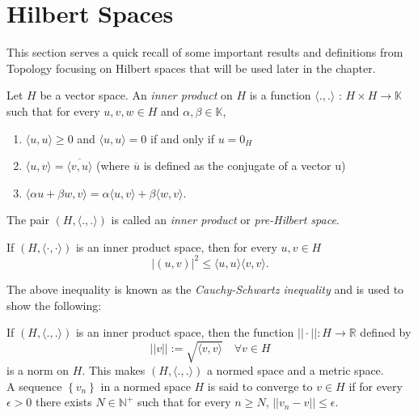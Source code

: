 \section{Hilbert Spaces}
This section serves a quick recall of some important results and definitions from Topology focusing on Hilbert spaces that will be used later in the chapter. 
\begin{definition}
Let $H$ be a vector space. An \textit{inner product} on $H$ is a function $\langle.,. \rangle$ : $H \times H \rightarrow \mathbb{K}$ such that for every $u, v, w \in H$ and $\alpha, \beta \in \mathbb{K}$,
\begin{enumerate}
\item $\langle u,u \rangle \geq 0$ and $\langle u,u \rangle = 0$ if and only if $u = 0_{H}$
\item $\langle u,v \rangle = \overline{\langle v,u \rangle}$ (where $\overline{u}$ is defined as the conjugate of a vector u)
\item $\langle \alpha u + \beta w,v \rangle = \alpha \langle u,v \rangle + \beta \langle w,v \rangle$.
\end{enumerate}
The pair $\left(H, \langle.,. \rangle\right)$ is called an \textit{inner product} or \textit{pre-Hilbert space}.
\end{definition} 

\begin{theorem}
If $\left(H, \langle\cdot,\cdot \rangle\right)$ is an inner product space, then for every $u,v \in H$
\begin{equation}
|\left(u,v\right)|^2 \leq \langle u,u \rangle \langle v,v \rangle.
\end{equation}
\end{theorem}
The above inequality is known as the \textit{Cauchy-Schwartz inequality} and is used to show the following:

\begin{theorem}
If $\left(H, \langle.,. \rangle\right)$ is an inner product space, then the function $||\cdot||: H \rightarrow \mathbb{R}$ defined by
\begin{equation}
||v|| := \sqrt{\langle v,v \rangle} \quad \forall v \in H
\end{equation} 
is a norm on $H$. This makes $\left(H, \langle.,. \rangle\right)$ a normed space and a metric space.\\
A sequence $\left\{v_n\right\}$ in a normed space $H$ is said to converge to $v \in H$ if for every $\epsilon > 0$ there exists $N \in \mathbb{N}^{+}$ such that for every $n \geq N$, $||v_n - v|| \leq \epsilon$.
\end{theorem}

